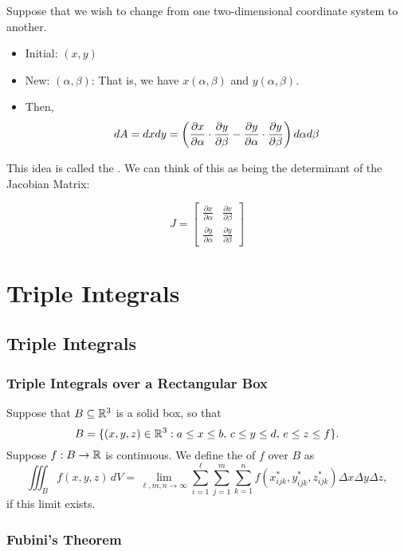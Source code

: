 Suppose that we wish to change from one two-dimensional coordinate system to another.

\begin{itemize}
  \item Initial: \((x, y)\)
  \item New: \((\alpha, \beta)\): That is, we have \(x(\alpha, \beta)\) and \(y(\alpha, \beta)\).
  \item Then, 
  \[
    dA = dxdy = \left(\frac{\partial x}{\partial \alpha} \cdot \frac{\partial y}{\partial \beta} - \frac{\partial y}{\partial \alpha} \cdot \frac{\partial y}{\partial \beta}\right) d\alpha d\beta
  \]
\end{itemize}

This idea is called the . We can think of this as being the determinant of the Jacobian Matrix:

\[
  J = \begin{bmatrix} \frac{\partial x}{\partial \alpha} & \frac{\partial x}{\partial \beta} \\ \frac{\partial y}{\partial \alpha} & \frac{\partial y}{\partial \beta} \end{bmatrix}
\]

\newpage

\section{Triple Integrals}

\subsection{Triple Integrals}

\subsubsection{Triple Integrals over a Rectangular Box}

Suppose that \(B \subseteq \mathbb{R}^3\) is a solid box, so that
\[
  B = \{(x, y, z) \in \mathbb{R}^3 : a \leq x \leq b, \, c \leq y \leq d, \, e \leq z \leq f\}.
\]
Suppose \(f : B \to \mathbb{R}\) is continuous. We define the  of \(f\) over \(B\) as
\[
  \iiint_B f(x, y, z) \, dV = \lim_{\ell, m, n \to \infty} \sum_{i=1}^{\ell} \sum_{j=1}^{m} \sum_{k=1}^{n} f(x^*_{ijk}, y^*_{ijk}, z^*_{ijk}) \Delta x \Delta y \Delta z,
\]
if this limit exists.

\subsubsection{Fubini’s Theorem}

